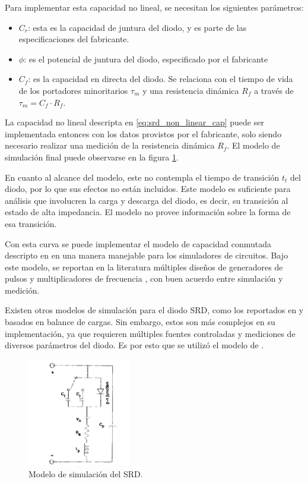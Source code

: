 Para implementar esta capacidad no lineal, se necesitan los siguientes
parámetros:

\begin{itemize}
    \item $C_r$: esta es la capacidad de juntura del diodo, y es parte de las
        especificaciones del fabricante.
    \item $\phi$: es el potencial de juntura del diodo, especificado por el
        fabricante
    \item $C_f$: es la capacidad en directa del diodo. Se relaciona con el
        tiempo de vida de los portadores minoritarios $\tau_m$ y una resistencia
        dinámica $R_f$ a través de $\tau_m = C_f \cdot R_f$.
        \cite{Kotzebue1965}
\end{itemize}

La capacidad no lineal descripta en \ref{eq:srd_non_linear_cap} puede ser
implementada entonces con los datos provistos por el fabricante, solo siendo
necesario realizar una medición de la resistencia dinámica $R_f$. El modelo de
simulación final puede observarse en la figura \ref{fig:srd_circuit_model}.

En cuanto al alcance del modelo, este no contempla el tiempo de transición $t_t$
del diodo, por lo que sus efectos no están incluidos. Este modelo es suficiente
para análisis que involucren la carga y descarga del diodo, es decir, su
transición al estado de alta impedancia. El modelo no provee información sobre
la forma de esa transición.

Con esta curva se puede implementar el modelo de capacidad conmutada descripto
en \cite{moll1969} en una manera manejable para los simuladores de circuitos.
Bajo este modelo, se reportan en la literatura múltiples diseños de generadores
de pulsos \cite{Ruengwaree2006} \cite{Rahman2022} y multiplicadores de
frecuencia \cite{zhang1996} \cite{Heymann2001}, con buen acuerdo entre
simulación y medición.

Existen otros modelos de simulación para el diodo SRD, como los reportados en
\cite{Opalska1997} y \cite{Shevchenko2022} basados en balance de cargas. Sin
embargo, estos son más complejos en su implementación, ya que requieren
múltiples fuentes controladas y mediciones de diversos parámetros del diodo. Es
por esto que se utilizó el modelo de \cite{zhang1995}.

\begin{figure}[t]
  \centering
    \includegraphics[width=0.4\textwidth]{images/srd_circuit_model.jpg}
    \caption{Modelo de simulación del SRD.}
    \label{fig:srd_circuit_model}
\end{figure}

